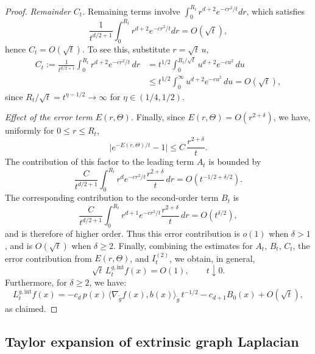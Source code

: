 \documentclass{amsart}
\theoremstyle{definition}
\theoremstyle{remark}
\newcommand{\nd}{\noindent}
\newcommand{\0}{\boldsymbol{0}}
\begin{document}
\begin{proof}



\medskip\noindent
\textit{Remainder $C_t$.}
Remaining terms involve $\int_0^{R_t} r^{d+2} e^{-c r^2/t}dr$, which satisfies
\[
\frac{1}{t^{d/2+1}}\int_0^{R_t} r^{d+2} e^{-c r^2/t}dr= O(\sqrt t),
\]
hence $C_t=O(\sqrt t)$. To see this, substitute $r=\sqrt{t}\,u$,
\begin{align*}
C_t:=\frac{1}{t^{d/2+1}}\int_0^{R_t} r^{d+2} e^{-cr^2/t}\,dr
&= t^{1/2}\!\int_0^{R_t/\sqrt t} u^{d+2} e^{-cu^2}\,du \\[-0.1cm]
&\le t^{1/2}\!\int_0^\infty u^{d+2} e^{-cu^2}\,du
= O(\sqrt t),
\end{align*}
since $R_t/\sqrt t=t^{\eta-1/2}\to\infty$ for $\eta\in(1/4,1/2)$.

\medskip\noindent
\textit{Effect of the error term $E(r,\Theta)$.}
Finally, since $E(r,\Theta)=O(r^{2+\delta})$, we have, uniformly for $0\le r\le R_t$,
\[
\bigl|e^{-E(r,\Theta)/t}-1\bigr|
\le C\,\frac{r^{2+\delta}}{t}.
\]
The contribution of this factor to the leading term $A_t$ is bounded by
\[
\frac{C}{t^{d/2+1}}\int_0^{R_t} r^{d}e^{-cr^2/t}\frac{r^{2+\delta}}{t}\,dr
=O(t^{-1/2+\delta/2}).
\]
The corresponding contribution to the second-order term $B_t$ is
\[
\frac{C}{t^{d/2+1}}\int_0^{R_t} r^{d+1}e^{-cr^2/t}\frac{r^{2+\delta}}{t}\,dr
=O(t^{\delta/2}),
\]
and is therefore of higher order. Thus this error contribution is $o(1)$ when $\delta>1$, and is $O(\sqrt t)$ when $\delta\ge2$.
\medskip
\nd \nd Finally, combining the estimates for $A_t$, $B_t$, $C_t$, the error contribution from $E(r,\Theta)$, and $I_t^{(2)}$, we obtain, in general,
\[
\sqrt{t}\,L_t^{g,\mathrm{int}}f(x)=O(1), \qquad t\downarrow0.
\]
Furthermore, for $\delta\ge2$, we have:
\[
L_t^{g,\mathrm{int}} f(x)
= -c_d\,p(x)\,\langle\nabla_{\widetilde g} f(x),b(x)\rangle_{\widetilde g}\, t^{-1/2}
  - c_{d+1}B_0(x)
  + O(\sqrt t),
\]
as claimed. 
\end{proof}



\subsection{Taylor expansion of extrinsic graph Laplacian }
\end{document}
